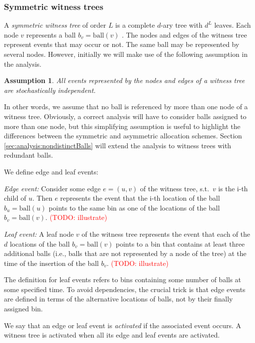 \documentclass[a4paper,12pt]{article}
\newcommand\todo[1]{\textcolor{red}{(TODO: #1)}}
\newtheorem{assumption}{Assumption}
\begin{document}
\subsubsection{Symmetric witness trees}
\label{sec:analysis:definitionSymWT}
A \emph{symmetric witness tree} of order $L$ is a complete $d$-ary tree with $d^{L}$ leaves. Each node $v$ represents a ball $b_v = \mathrm{ball}(v)$ . The nodes and edges of the witness tree represent events that may occur or not. The same ball may be represented by several nodes. However, initially we will make use of the following assumption in the analysis.
\begin{assumption}
\label{assumption:independence}
All events represented by the nodes and edges of a witness tree are stochastically independent. 
\end{assumption}
In other words, we assume that no ball is referenced by more than one node of a witness tree. Obviously, a correct analysis will have to consider balls assigned to more than one node, but this simplifying assumption is useful to highlight the differences between the symmetric and asymmetric allocation schemes. Section \ref{sec:analysis:nondistinctBalls} will extend the analysis to witness trees with redundant balls.

We define edge and leaf events:
\begin{compactitem}
\item \emph{Edge event:} Consider some edge $e = (u,v)$ of the witness tree, s.t.~$v$ is the i-th child of $u$. Then $e$ represents the event that the i-th location of the ball $b_u = \mathrm{ball}(u)$ points to the same bin as one of the locations of the ball $b_v = \mathrm{ball}(v)$. 
\todo{illustrate}
\item \emph{Leaf event:} A leaf node $v$ of the witness tree represents the event that each of the $d$ locations of the ball $b_v = \mathrm{ball}(v)$ points to a bin that contains at least three additional balls (i.e., balls that are not represented by a node of the tree) at the time of the insertion of the ball $b_v$.
\todo{illustrate}
\end{compactitem}
The definition for leaf events refers to bins containing some number of balls at some specified time. To avoid dependencies, the crucial trick is that edge events are defined in terms of the alternative locations of balls, not by their finally assigned bin. 

We say that an edge or leaf event is \emph{activated} if the associated event occurs. A witness tree is activated when all its edge and leaf events are activated. 
\end{document}
